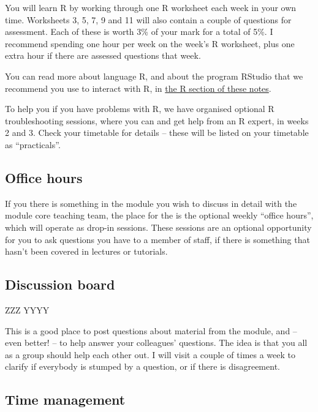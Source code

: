 \documentclass[
  a4paper,
]{book}
\theoremstyle{definition}
\theoremstyle{definition}
\theoremstyle{definition}
\theoremstyle{remark}
\begin{document}
You will learn R by working through one R worksheet each week in your own time. Worksheets 3, 5, 7, 9 and 11 will also contain a couple of questions for assessment. Each of these is worth 3\% of your mark for a total of 5\%. I recommend spending one hour per week on the week's R worksheet, plus one extra hour if there are assessed questions that week.

You can read more about language R, and about the program RStudio that we recommend you use to interact with R, in \protect\hyperlink{R}{the R section of these notes}.

To help you if you have problems with R, we have organised optional R troubleshooting sessions, where you can and get help from an R expert, in weeks 2 and 3. Check your timetable for details -- these will be listed on your timetable as ``practicals''.

\hypertarget{dropin}{%
\subsection*{Office hours}\label{dropin}}

If you there is something in the module you wish to discuss in detail with the module core teaching team, the place for the is the optional weekly ``office hours'', which will operate as drop-in sessions. These sessions are an optional opportunity for you to ask questions you have to a member of staff, if there is something that hasn't been covered in lectures or tutorials.

\hypertarget{discussion}{%
\subsection*{Discussion board}\label{discussion}}

ZZZ YYYY

This is a good place to post questions about material from the module, and -- even better! -- to help answer your colleagues' questions. The idea is that you all as a group should help each other out. I will visit a couple of times a week to clarify if everybody is stumped by a question, or if there is disagreement.

\hypertarget{time}{%
\subsection*{Time management}\label{time}}
\end{document}
